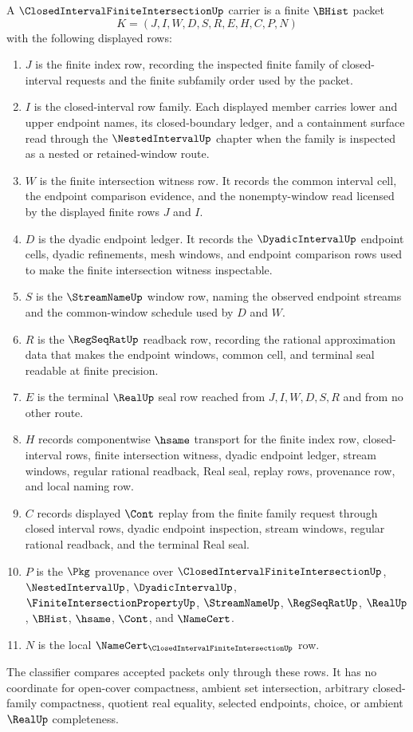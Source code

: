\begin{definition}
\label{def:closed-interval-finite-intersection-carrier}
A $\ClosedIntervalFiniteIntersectionUp$ carrier is a finite $\BHist$ packet
$$
K=(J,I,W,D,S,R,E,H,C,P,N)
$$
with the following displayed rows:
\begin{enumerate}
\item $J$ is the finite index row, recording the inspected finite family of closed-interval requests and the finite subfamily order used by the packet.
\item $I$ is the closed-interval row family. Each displayed member carries lower and upper endpoint names, its closed-boundary ledger, and a containment surface read through the $\NestedIntervalUp$ chapter when the family is inspected as a nested or retained-window route.
\item $W$ is the finite intersection witness row. It records the common interval cell, the endpoint comparison evidence, and the nonempty-window read licensed by the displayed finite rows $J$ and $I$.
\item $D$ is the dyadic endpoint ledger. It records the $\DyadicIntervalUp$ endpoint cells, dyadic refinements, mesh windows, and endpoint comparison rows used to make the finite intersection witness inspectable.
\item $S$ is the $\StreamNameUp$ window row, naming the observed endpoint streams and the common-window schedule used by $D$ and $W$.
\item $R$ is the $\RegSeqRatUp$ readback row, recording the rational approximation data that makes the endpoint windows, common cell, and terminal seal readable at finite precision.
\item $E$ is the terminal $\RealUp$ seal row reached from $J,I,W,D,S,R$ and from no other route.
\item $H$ records componentwise $\hsame$ transport for the finite index row, closed-interval rows, finite intersection witness, dyadic endpoint ledger, stream windows, regular rational readback, Real seal, replay rows, provenance row, and local naming row.
\item $C$ records displayed $\Cont$ replay from the finite family request through closed interval rows, dyadic endpoint inspection, stream windows, regular rational readback, and the terminal Real seal.
\item $P$ is the $\Pkg$ provenance over $\ClosedIntervalFiniteIntersectionUp$, $\NestedIntervalUp$, $\DyadicIntervalUp$, $\FiniteIntersectionPropertyUp$, $\StreamNameUp$, $\RegSeqRatUp$, $\RealUp$, $\BHist$, $\hsame$, $\Cont$, and $\NameCert$.
\item $N$ is the local $\NameCert_{\ClosedIntervalFiniteIntersectionUp}$ row.
\end{enumerate}
The classifier compares accepted packets only through these rows. It has no coordinate for open-cover compactness, ambient set intersection, arbitrary closed-family compactness, quotient real equality, selected endpoints, choice, or ambient $\RealUp$ completeness.
\end{definition}

